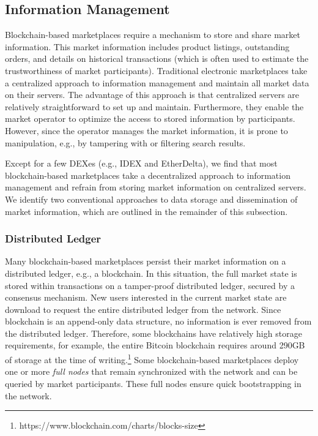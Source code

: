 \subsection{Information Management}
Blockchain-based marketplaces require a mechanism to store and share market information.
This market information includes product listings, outstanding orders, and details on historical transactions (which is often used to estimate the trustworthiness of market participants).
Traditional electronic marketplaces take a centralized approach to information management and maintain all market data on their servers.
The advantage of this approach is that centralized servers are relatively straightforward to set up and maintain.
Furthermore, they enable the market operator to optimize the access to stored information by participants.
However, since the operator manages the market information, it is prone to manipulation, e.g., by tampering with or filtering search results.

Except for a few DEXes (e.g., IDEX and EtherDelta), we find that most blockchain-based marketplaces take a decentralized approach to information management and refrain from storing market information on centralized servers.
We identify two conventional approaches to data storage and dissemination of market information, which are outlined in the remainder of this subsection.

\subsubsection{Distributed Ledger}
Many blockchain-based marketplaces persist their market information on a distributed ledger, e.g., a blockchain.
In this situation, the full market state is stored within transactions on a tamper-proof distributed ledger, secured by a consensus mechanism.
New users interested in the current market state are download to request the entire distributed ledger from the network.
Since blockchain is an append-only data structure, no information is ever removed from the distributed ledger.
Therefore, some blockchains have relatively high storage requirements, for example, the entire Bitcoin blockchain requires around 290GB of storage at the time of writing.\footnote{https://www.blockchain.com/charts/blocks-size}
Some blockchain-based marketplaces deploy one or more \emph{full nodes} that remain synchronized with the network and can be queried by market participants.
These full nodes ensure quick bootstrapping in the network.

